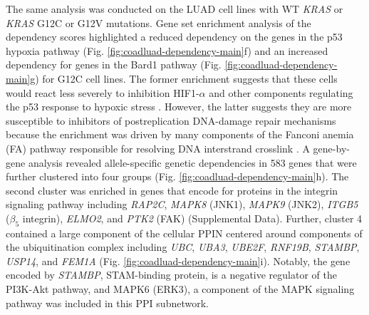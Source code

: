 \documentclass[english, 10pt, letterpaper]{article}
\newcommand{\KRAS}{\emph{KRAS}}
\begin{document}
The same analysis was conducted on the LUAD cell lines with WT \KRAS{} or \KRAS{} G12C or G12V mutations.
Gene set enrichment analysis of the dependency scores highlighted a reduced dependency on the genes in the p53 hypoxia pathway (Fig. \ref{fig:coadluad-dependency-main}f) and an increased dependency for genes in the Bard1 pathway (Fig. \ref{fig:coadluad-dependency-main}g) for G12C cell lines.
The former enrichment suggests that these cells would react less severely to inhibition HIF1-$\alpha$ and other components regulating the p53 response to hypoxic stress \cite{Goda2003Hypoxia-inducibleHypoxia., Sermeus2011ReciprocalPathways., Jing2019RoleMicroenvironment.}.
However, the latter suggests they are more susceptible to inhibitors of postreplication DNA-damage repair mechanisms because the enrichment was driven by many components of the Fanconi anemia (FA) pathway responsible for resolving DNA interstrand crosslink \cite{Ceccaldi2016TheFunctions.}.
A gene-by-gene analysis revealed allele-specific genetic dependencies in 583 genes that were further clustered into four groups (Fig. \ref{fig:coadluad-dependency-main}h).
The second cluster was enriched in genes that encode for proteins in the integrin signaling pathway including \emph{RAP2C}, \emph{MAPK8} (JNK1), \emph{MAPK9} (JNK2), \emph{ITGB5} ($\beta_5$ integrin), \emph{ELMO2}, and \emph{PTK2} (FAK) (Supplemental Data).
Further, cluster 4 contained a large component of the cellular PPIN centered around components of the ubiquitination complex including \emph{UBC}, \emph{UBA3}, \emph{UBE2F}, \emph{RNF19B}, \emph{STAMBP}, \emph{USP14}, and \emph{FEM1A} (Fig. \ref{fig:coadluad-dependency-main}i).
Notably, the gene encoded by \emph{STAMBP}, STAM-binding protein, is a negative regulator of the PI3K-Akt pathway, and MAPK6 (ERK3), a component of the MAPK signaling pathway was included in this PPI subnetwork. 
\end{document}
